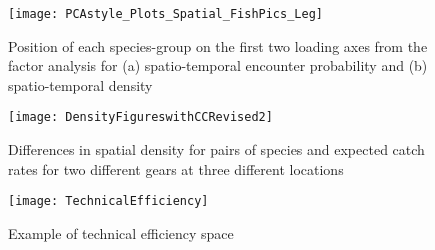 \documentclass{nature}
\begin{document}
\begin{figure}
\begin{center}
	\texttt{[image: PCAstyle\_Plots\_Spatial\_FishPics\_Leg]}
	\label{fig:3}
	\caption{Position of each species-group on the first two loading axes from the
	factor analysis for (a) spatio-temporal encounter probability and (b)
	spatio-temporal density}
\end{center}
\end{figure}

\begin{figure}
\begin{center}
	\texttt{[image: DensityFigureswithCCRevised2]}
	\label{fig:4}
	\caption{Differences in spatial density for pairs of species and
		expected catch rates for two different gears at three different
	locations}
\end{center}
\end{figure}

\begin{figure}
\begin{center}
	\texttt{[image: TechnicalEfficiency]}
	\label{fig:5}
	\caption{Example of technical efficiency space}
\end{center}
\end{figure}
\end{document}
